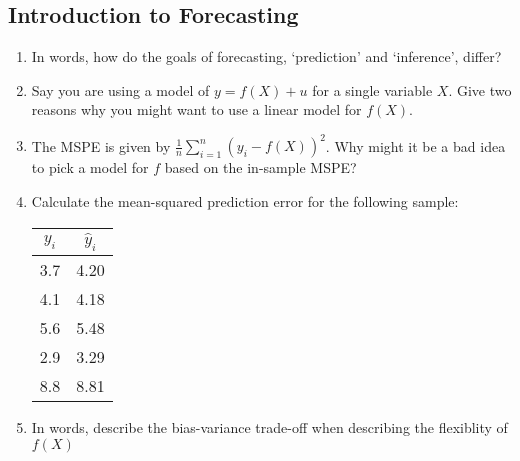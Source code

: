\documentclass[12pt]{article}
\begin{document}
\subsection*{Introduction to Forecasting}
\begin{enumerate}
  \item In words, how do the goals of forecasting, `prediction' and `inference', differ?
  
  \item Say you are using a model of $y = f(X) + u$ for a single variable $X$. Give two reasons why you might want to use a linear model for $f(X)$.
  
  \item The MSPE is given by $\frac{1}{n} \sum_{i=1}^n \left( y_i - f(X) \right)^2$. Why might it be a bad idea to pick a model for $f$ based on the in-sample MSPE?
  
  \item Calculate the mean-squared prediction error for the following sample:
  
  \begin{tabular}{c c}
    $y_i$ & $\hat{y}_i$ \\
    \midrule
    3.7 & 4.20 \\
    4.1 & 4.18 \\
    5.6 & 5.48 \\
    2.9 & 3.29 \\
    8.8 & 8.81 \\
    \bottomrule
  \end{tabular}

  \vspace*{2.5mm}
  \item In words, describe the bias-variance trade-off when describing the flexiblity of $f(X)$
\end{enumerate}
\end{document}
